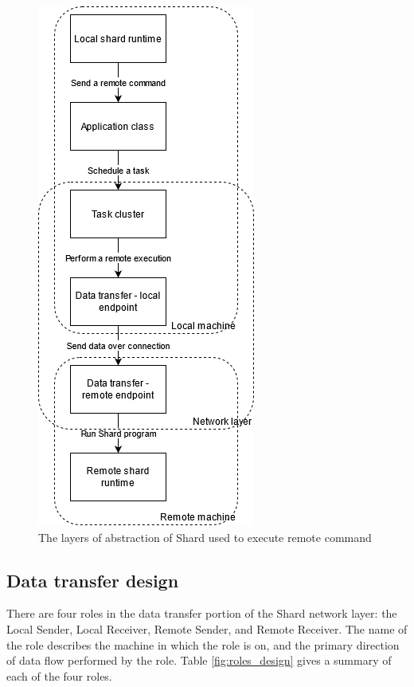 \documentclass[twoside]{report}
\begin{document}
\begin{figure}[h]
  \begin{center}
    \includegraphics[scale=0.5]{img/shard_network_design.png}
    \caption{The layers of abstraction of Shard used to execute remote command}
    \label{fig:network_layer_design}
  \end{center}
\end{figure}

\subsection{Data transfer design}
There are four roles in the data transfer portion of the Shard network layer: the Local Sender, Local Receiver, Remote Sender, and Remote Receiver.
The name of the role describes the machine in which the role is on, and the primary direction of data flow performed by the role.
Table \ref{fig:roles_design} gives a summary of each of the four roles.
\end{document}
